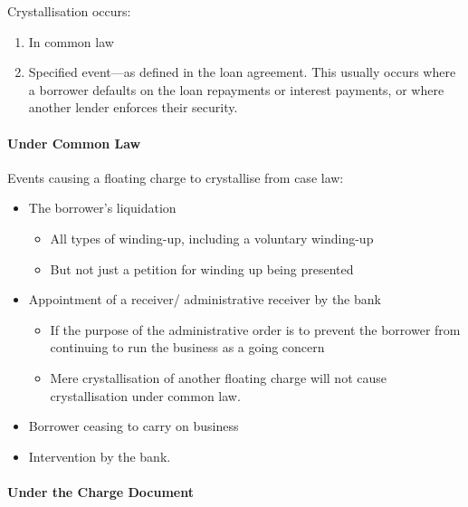\documentclass[
]{article}
\providecommand{\tightlist}{%
  \setlength{\itemsep}{0pt}\setlength{\parskip}{0pt}}
\begin{document}
Crystallisation occurs:

\begin{enumerate}
\def\labelenumi{\arabic{enumi}.}
\tightlist
\item
  In common law
\item
  Specified event---as defined in the loan agreement. This usually
  occurs where a borrower defaults on the loan repayments or interest
  payments, or where another lender enforces their security.
\end{enumerate}

\hypertarget{under-common-law}{%
\paragraph{Under Common Law}\label{under-common-law}}

Events causing a floating charge to crystallise from case law:

\begin{itemize}
\tightlist
\item
  The borrower's liquidation

  \begin{itemize}
  \tightlist
  \item
    All types of winding-up, including a voluntary winding-up
  \item
    But not just a petition for winding up being presented
  \end{itemize}
\item
  Appointment of a receiver/ administrative receiver by the bank

  \begin{itemize}
  \tightlist
  \item
    If the purpose of the administrative order is to prevent the
    borrower from continuing to run the business as a going concern
  \item
    Mere crystallisation of another floating charge will not cause
    crystallisation under common law.
  \end{itemize}
\item
  Borrower ceasing to carry on business
\item
  Intervention by the bank.
\end{itemize}

\hypertarget{under-the-charge-document}{%
\paragraph{Under the Charge Document}\label{under-the-charge-document}}
\end{document}
